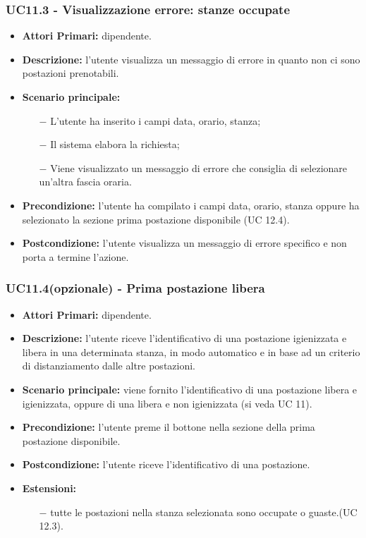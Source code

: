 \subsubsection{ UC11.3 - Visualizzazione errore: stanze occupate }
\begin{itemize}
	\item\textbf{Attori Primari:} dipendente.
	\item\textbf{Descrizione:} l’utente visualizza un messaggio di errore in quanto non ci sono postazioni prenotabili.
	\item\textbf{Scenario principale:} 
	\begin{itemize}
		\item[$-$] L’utente ha inserito i campi data, orario, stanza;
		\item[$-$] Il sistema elabora la richiesta;
		\item[$-$] Viene visualizzato un messaggio di errore che consiglia di selezionare un'altra fascia oraria.
	\end{itemize}
	\item\textbf{Precondizione:} l’utente ha compilato i campi data, orario, stanza oppure ha selezionato la sezione prima postazione 
	disponibile (UC 12.4).
	\item\textbf{Postcondizione:} l’utente visualizza un messaggio di errore specifico e non porta a termine l’azione.
\end{itemize}
\subsubsection{ UC11.4(opzionale) - Prima postazione libera }
\begin{itemize}
	\item\textbf{Attori Primari:} dipendente.
	\item\textbf{Descrizione:} l’utente riceve l'identificativo di una postazione igienizzata e libera in una determinata stanza, 
	in modo automatico e in base ad un criterio di distanziamento dalle altre postazioni.
	\item\textbf{Scenario principale:} viene fornito l'identificativo di una postazione libera e igienizzata, oppure di una libera e non igienizzata (si veda UC 11).
	\item\textbf{Precondizione:} l’utente preme il bottone nella sezione della prima postazione disponibile.
	\item\textbf{Postcondizione:} l’utente riceve l'identificativo di una postazione.
	\item\textbf{Estensioni:}
	\begin{itemize}
		\item[$-$] tutte le postazioni nella stanza selezionata sono occupate o guaste.(UC 12.3).
	\end{itemize}
\end{itemize}
